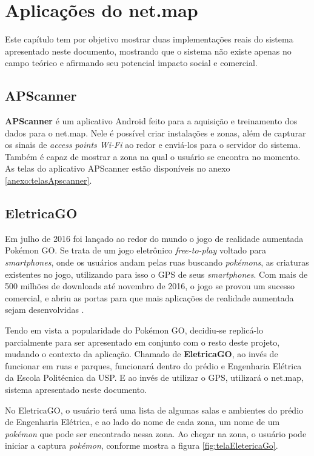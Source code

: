 \chapter{Aplicações do net.map}
\label{chp:applications}

Este capítulo tem por objetivo mostrar duas implementações reais do sistema apresentado neste documento, mostrando que o sistema não existe apenas no campo teórico e afirmando seu potencial impacto social e comercial.

\section{APScanner}

\textbf{APScanner} é um aplicativo Android feito para a aquisição e treinamento dos dados para o net.map. Nele é possível criar instalações e zonas, além de capturar os sinais de \textit{access points Wi-Fi} ao redor e enviá-los para o servidor do sistema. Também é capaz de mostrar a zona na qual o usuário se encontra no momento.
\\
As telas do aplicativo APScanner estão disponíveis no anexo \ref{anexo:telasApscanner}.

\section{EletricaGO}

Em julho de 2016 foi lançado ao redor do mundo o jogo de realidade aumentada Pokémon GO. Se trata de um jogo eletrônico \textit{free-to-play} voltado para \textit{smartphones}, onde os usuários andam pelas ruas buscando \textit{pokémons}, as criaturas existentes no jogo, utilizando para isso o GPS de seus \textit{smartphones}. Com mais de 500 milhões de downloads até novembro de 2016, o jogo se provou um sucesso comercial, e abriu as portas para que mais aplicações de realidade aumentada sejam desenvolvidas \cite{dapokemon}.
\par
Tendo em vista a popularidade do Pokémon GO, decidiu-se replicá-lo parcialmente para ser apresentado em conjunto com o resto deste projeto, mudando o contexto da aplicação. Chamado de \textbf{EletricaGO}, ao invés de funcionar em ruas e parques, funcionará dentro do prédio e Engenharia Elétrica da Escola Politécnica da USP. E ao invés de utilizar o GPS, utilizará o net.map, sistema apresentado neste documento.
\par
No EletricaGO, o usuário terá uma lista de algumas salas e ambientes do prédio de Engenharia Elétrica, e ao lado do nome de cada zona, um nome de um \textit{pokémon} que pode ser encontrado nessa zona. Ao chegar na zona, o usuário pode iniciar a captura \textit{pokémon}, conforme mostra a figura \ref{fig:telaEletericaGo}.

